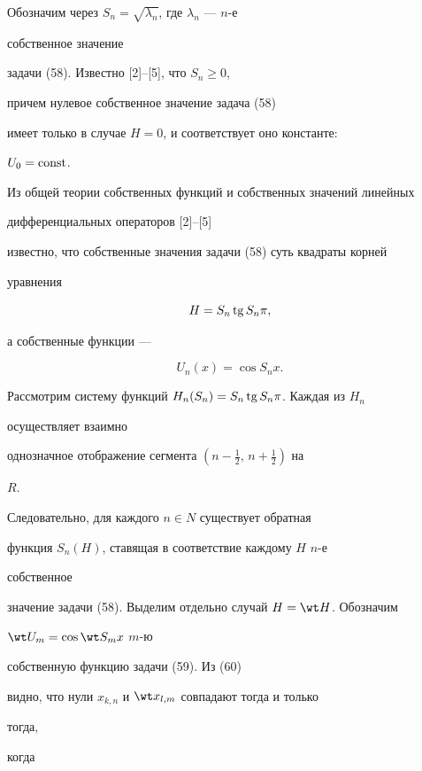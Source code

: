  


\begin{pf} 


Обозначим через $S_n=\sqrt{\lambda_n}$, где $\lambda_n$ --- $n$-е 


собственное значение 


задачи (58). Известно [2]--[5], что $S_n\ge0$, 


причем нулевое собственное значение задача (58) 


имеет только в случае $H=0$, и соответствует оно константе:


$U_0=\operatorname{const}$. 


Из общей теории собственных функций и собственных значений линейных 


дифференциальных операторов [2]--[5] 


известно, что собственные значения задачи (58) суть квадраты корней 


уравнения 


$$ 


H=S_n\tg S_n\pi, 


$$ 


а собственные функции ---


\begin{equation} 


U_n(x)=\cos S_n x. 


\end{equation}  


Рассмотрим систему функций $H_n(S_n)=S_n\operatorname{tg} S_n\pi$. Каждая из $H_n$ 


осуществляет взаимно 


однозначное отображение сегмента $(n-\frac{1}{2},\,n+\frac{1}{2})$ на 


$R$. 


Следовательно, для каждого $n\in N$ существует обратная 


функция $S_n(H)$, ставящая в соответствие каждому $H$\; $n$-е 


собственное 


значение задачи (58). Выделим отдельно случай $H=\wt H$. Обозначим 


$\wt U_m=\cos\wt S_m x$\; $m$-ю 


собственную функцию задачи (59). Из (60) 


видно, что нули $x_{k,n}$ и $\wt x_{l,m}$ совпадают тогда и только 


тогда, 


когда 


$$ 



\end{pf}
